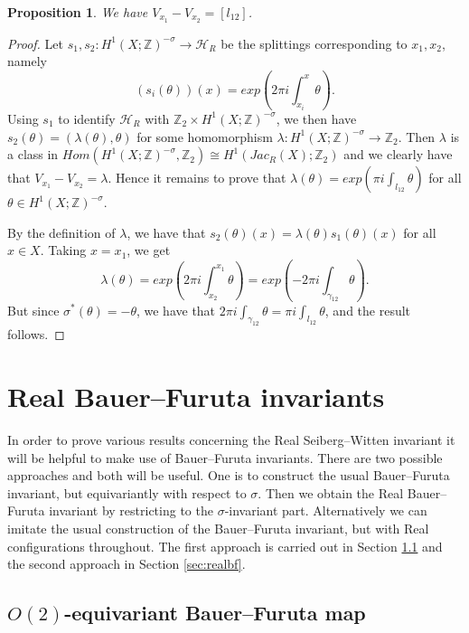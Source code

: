 \documentclass{amsart}
\newtheorem{proposition}[theorem]{Proposition}
\theoremstyle{definition}
\theoremstyle{remark}
\numberwithin{equation}{section}
\begin{document}
\begin{proposition}
We have $V_{x_1} - V_{x_2} = [l_{12}]$.
\end{proposition}
\begin{proof}
Let $s_1,s_2 : H^1(X ; \mathbb{Z})^{-\sigma} \to \mathcal{H}_R$ be the splittings corresponding to $x_1,x_2$, namely
\[
(s_i(\theta))(x) = exp \left( 2 \pi i \int_{x_i}^x \theta \right).
\]
Using $s_1$ to identify $\mathcal{H}_R$ with $\mathbb{Z}_2 \times H^1(X ; \mathbb{Z})^{-\sigma}$, we then have $s_2( \theta ) = ( \lambda(\theta) , \theta )$ for some homomorphism $\lambda : H^1( X ; \mathbb{Z})^{-\sigma} \to \mathbb{Z}_2$. Then $\lambda$ is a class in $Hom( H^1(X ; \mathbb{Z})^{-\sigma} , \mathbb{Z}_2) \cong H^1( Jac_R(X) ; \mathbb{Z}_2)$ and we clearly have that $V_{x_1} - V_{x_2} = \lambda$. Hence it remains to prove that $\lambda(\theta) = exp( \pi i \int_{l_{12}} \theta )$ for all $\theta \in H^1(X ; \mathbb{Z})^{-\sigma}$.

By the definition of $\lambda$, we have that $s_2(\theta)(x) = \lambda(\theta) s_1(\theta)(x)$ for all $x \in X$. Taking $x = x_1$, we get
\[
\lambda(\theta) = exp \left( 2 \pi i \int_{x_2}^{x_1} \theta \right) = exp \left( -2\pi i \int_{\gamma_{12}} \theta \right).
\]
But since $\sigma^*(\theta) = -\theta$, we have that $2\pi i \int_{\gamma_{12}} \theta = \pi i \int_{ l_{12} } \theta$, and the result follows.
\end{proof}



\section{Real Bauer--Furuta invariants}\label{sec:rbf}

In order to prove various results concerning the Real Seiberg--Witten invariant it will be helpful to make use of Bauer--Furuta invariants. There are two possible approaches and both will be useful. One is to construct the usual Bauer--Furuta invariant, but equivariantly with respect to $\sigma$. Then we obtain the Real Bauer--Furuta invariant by restricting to the $\sigma$-invariant part. Alternatively we can imitate the usual construction of the Bauer--Furuta invariant, but with Real configurations throughout. The first approach is carried out in Section \ref{sec:O(2)} and the second approach in Section \ref{sec:realbf}.

\subsection{$O(2)$-equivariant Bauer--Furuta map}\label{sec:O(2)}
\end{document}
